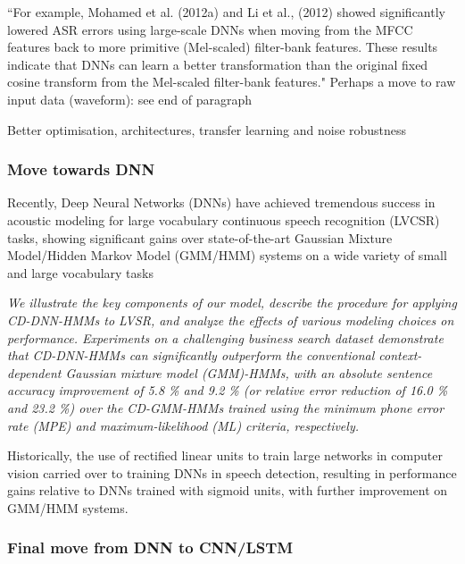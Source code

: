 \documentclass[12pt]{llncs}
\begin{document}
``For example, Mohamed et al. (2012a) \cite[firstExampleMovingGMMsectionofHMM/GMMtoDNN]{mohamed2012acoustic} and Li et al., (2012) showed
significantly lowered ASR errors using large-scale DNNs when moving from the MFCC features back to
more primitive (Mel-scaled) filter-bank features. These results indicate that DNNs can learn a better
transformation than the original fixed cosine transform from the Mel-scaled filter-bank features."
Perhaps a move to raw input data (waveform): see end of paragraph

Better optimisation, architectures, transfer learning and noise robustness

\subsubsection{Move towards DNN}

Recently, Deep Neural Networks (DNNs) have achieved tremendous
success in acoustic modeling for large vocabulary continuous
speech recognition (LVCSR) tasks, showing significant gains over
state-of-the-art Gaussian Mixture Model/Hidden Markov Model
(GMM/HMM) systems on a wide variety of small and large vocabulary
tasks 


\cite{dahl2012context}
\emph{We illustrate the key components of our model, describe the procedure for applying CD-DNN-HMMs to LVSR, and analyze the effects of various modeling choices on performance. Experiments on a challenging
business search dataset demonstrate that CD-DNN-HMMs
can significantly outperform the conventional context-dependent
Gaussian mixture model (GMM)-HMMs, with an absolute sentence
accuracy improvement of 5.8 \% and 9.2 \% (or relative error
reduction of 16.0 \% and 23.2 \%) over the CD-GMM-HMMs trained
using the minimum phone error rate (MPE) and maximum-likelihood
(ML) criteria, respectively.}


Historically, the use of rectified linear units to train large networks in computer vision carried over to training DNNs in speech detection, resulting in performance gains relative to DNNs trained with sigmoid units, with further improvement on GMM/HMM systems. \cite{dahl2013improving}




\subsubsection{Final move from DNN to CNN/LSTM}
\end{document}
